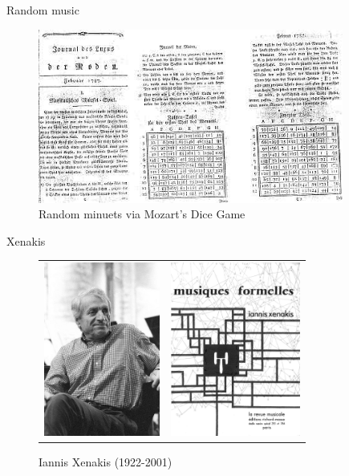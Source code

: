 \begin{frame}{Random music}
    \begin{figure}
    \begin{centering}
    \includegraphics[height=2.25in]{assets/include-dice-game.jpg}
    \caption{Random minuets via Mozart's Dice Game}
    \end{centering}
    \end{figure}
\end{frame}

\begin{frame}{Xenakis}
    \begin{figure}
    \begin{centering}
    \begin{tabular}{cc}
    \includegraphics[height=2.25in]{assets/include-xenakis-portrait.jpg}
    &
    \includegraphics[height=2.25in]{assets/include-xenakis-formalized-music.jpg}
    \end{tabular}
    \caption{Iannis Xenakis (1922-2001)}
    \end{centering}
    \end{figure}
\end{frame}


